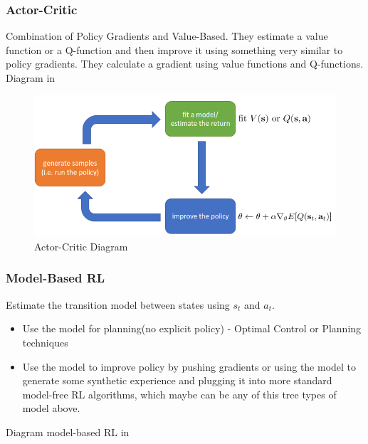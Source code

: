 \documentclass[]{article}
\begin{document}
\subsubsection*{Actor-Critic}
\label{sub:Actor-Critic}

\par Combination of Policy Gradients and Value-Based. They estimate a value function or a Q-function and then 
improve it using something very similar to policy gradients. They calculate a gradient using value
functions and Q-functions. Diagram in 

\begin{figure}
\begin{center}
    \includegraphics[scale=0.5]{cap3img/actor.png}
\end{center}
\caption{Actor-Critic Diagram}
\label{fig:actor}
\end{figure}

\subsubsection*{Model-Based RL}
\label{sub:Model-Based RL}

\par Estimate the transition model between states using $s_{t}$ and $a_{t}$. 
\begin{itemize}
    \item Use the model for planning(no explicit policy) - Optimal Control or Planning techniques
    \item Use the model to improve policy by pushing gradients or using the model to generate some synthetic
        experience and plugging it into more standard model-free RL algorithms, which maybe can be any of  this tree
        types of model above.
\end{itemize}

\par Diagram model-based RL in 
\end{document}
